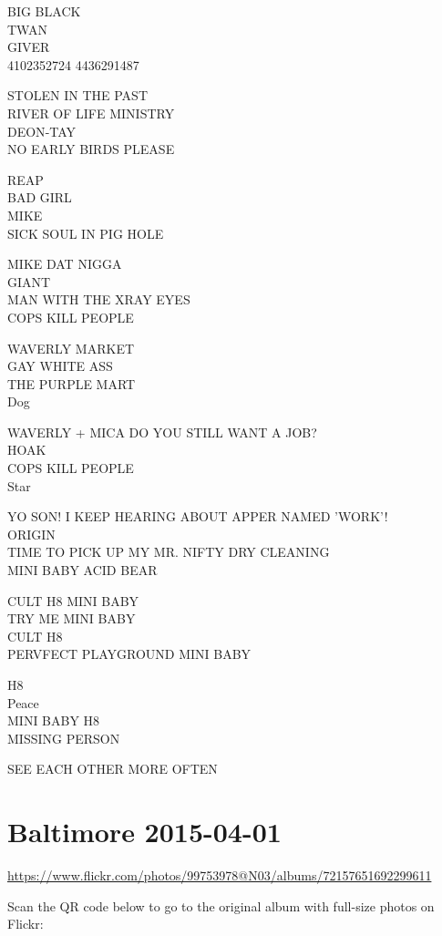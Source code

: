 \documentclass[10pt,letterpaper]{article}
\begin{document}
BIG BLACK\\
TWAN\\
GIVER\\
4102352724 4436291487

STOLEN IN THE PAST\\
RIVER OF LIFE MINISTRY\\
DEON{-}TAY\\
NO EARLY BIRDS PLEASE

REAP\\
BAD GIRL\\
MIKE\\
SICK SOUL IN PIG HOLE

MIKE DAT NIGGA\\
GIANT\\
MAN WITH THE XRAY EYES\\
COPS KILL PEOPLE

WAVERLY MARKET\\
GAY WHITE ASS\\
THE PURPLE MART\\
Dog

WAVERLY + MICA DO YOU STILL WANT A JOB?\\
HOAK\\
COPS KILL PEOPLE\\
Star

YO SON!  I KEEP HEARING ABOUT APPER NAMED 'WORK'!\\
ORIGIN\\
TIME TO PICK UP MY MR. NIFTY DRY CLEANING\\
MINI BABY ACID BEAR

CULT H8 MINI BABY\\
TRY ME MINI BABY\\
CULT H8\\
PERVFECT PLAYGROUND MINI BABY

H8\\
Peace\\
MINI BABY H8\\
MISSING PERSON

SEE EACH OTHER MORE OFTEN


\section*{Baltimore 2015-04-01}

\url{https://www.flickr.com/photos/99753978@N03/albums/72157651692299611}

Scan the QR code below to go to the original album with full-size photos on Flickr:
\end{document}
